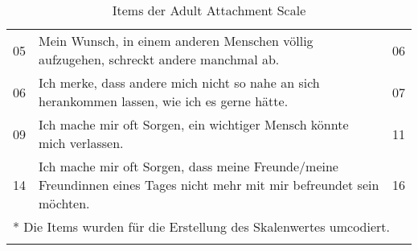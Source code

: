 \begin{table}[htbp]
\begin{tabular}{|l | m{30em} | p{2em}|}
  05 & Mein Wunsch, in einem anderen Menschen völlig aufzugehen, schreckt andere manchmal ab. & 06 \\
  06 & Ich merke, dass andere mich nicht so nahe an sich herankommen lassen, wie ich es gerne hätte. & 07 \\
  09 & Ich mache mir oft Sorgen, ein wichtiger Mensch könnte mich verlassen. & 11 \\
  14 & Ich mache mir oft Sorgen, dass meine Freunde/meine Freundinnen eines Tages nicht mehr mit mir befreundet sein möchten. & 16 \\
  \hline
  \multicolumn{3}{l}{* Die Items wurden für die Erstellung des Skalenwertes umcodiert.}\\
  \multicolumn{3}{l}{}\\
\end{tabular}
\caption{Items der Adult Attachment Scale}
\label{table:AASItems}
\end{table}
